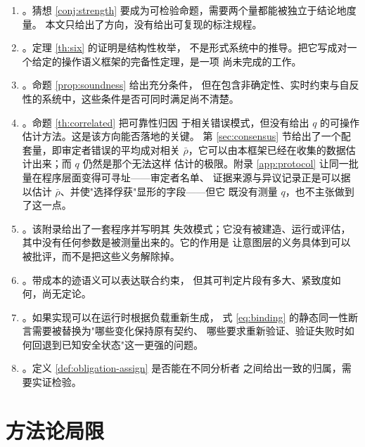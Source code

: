 \begin{enumerate}[label=(O\arabic*)]
\item {}。猜想
      \ref{conj:strength} 要成为可检验命题，需要两个量都能被独立于结论地度量。
      本文只给出了方向，没有给出可复现的标注规程。
\item {}。定理 \ref{th:six} 的证明是结构性枚举，
      不是形式系统中的推导。把它写成对一个给定的操作语义框架的完备性定理，是一项
      尚未完成的工作。
\item {}。命题 \ref{prop:soundness} 给出充分条件，
      但在包含非确定性、实时约束与自反性的系统中，这些条件是否可同时满足尚不清楚。
\item {}\label{op:q}。命题 \ref{th:correlated} 把可靠性归因
      于相关错误模式，但没有给出 $q$ 的可操作估计方法。这是该方向能否落地的关键。
      第 \ref{sec:consensus} 节给出了一个配套量，即审定者错误的平均成对相关
      $\bar\rho$，它可以由本框架已经在收集的数据估计出来；而 $q$ 仍然是那个无法这样
      估计的极限。附录 \ref{app:protocol} 让同一批量在程序层面变得可寻址——审定者名单、
      证据来源与异议记录正是可以据以估计 $\bar\rho$、并使"选择俘获"显形的字段——但它
      既没有测量 $q$，也不主张做到了这一点。
\item {}。该附录给出了一套程序并写明其
      失效模式；它没有被建造、运行或评估，其中没有任何参数是被测量出来的。它的作用是
      让意图层的义务具体到可以被批评，而不是把这些义务解除掉。
\item {}。带成本的迹语义可以表达联合约束，
      但其可判定片段有多大、紧致度如何，尚无定论。
\item {}。如果实现可以在运行时根据负载重新生成，
      式 \eqref{eq:binding} 的静态同一性断言需要被替换为"哪些变化保持原有契约、
      哪些要求重新验证、验证失败时如何回退到已知安全状态"这一更强的问题。
\item {}。定义 \ref{def:obligation-assign} 是否能在不同分析者
      之间给出一致的归属，需要实证检验。
\end{enumerate}

\section{方法论局限}

